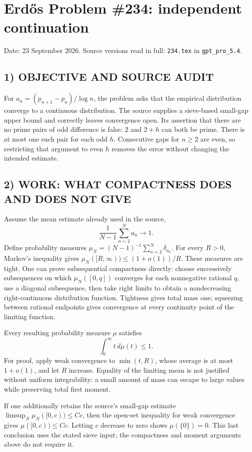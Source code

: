 \section{Erd\H{o}s Problem \#234: independent continuation}
\noindent Date: 23 September 2026. Source versions read in full: \texttt{234.tex} in \texttt{gpt\_pro\_5.4}.

\subsection*{1) OBJECTIVE AND SOURCE AUDIT}
For $a_n=(p_{n+1}-p_n)/\log n$, the problem asks that the empirical
distribution converge to a continuous distribution. The source supplies
a sieve-based small-gap upper bound and correctly leaves convergence open.
Its assertion that there are no prime pairs of odd difference is false:
$2$ and $2+h$ can both be prime. There is at most one such pair for each odd
$h$. Consecutive gaps for $n\ge2$ are even, so restricting that argument to
even $h$ removes the error without changing the intended estimate.

\subsection*{2) WORK: WHAT COMPACTNESS DOES AND DOES NOT GIVE}
Assume the mean estimate already used in the source,
\[
 \frac1{N-1}\sum_{n=2}^N a_n\longrightarrow1.
\]
Define probability measures $\mu_N=(N-1)^{-1}\sum_{n=2}^N\delta_{a_n}$.
For every $R>0$, Markov's inequality gives
$\mu_N([R,\infty))\le(1+o(1))/R$. These measures are tight.
One can prove subsequential compactness directly: choose successively
subsequences on which $\mu_N([0,q])$ converges for each nonnegative rational
$q$, use a diagonal subsequence, then take right limits to obtain a
nondecreasing right-continuous distribution function. Tightness gives
total mass one; squeezing between rational endpoints gives convergence
at every continuity point of the limiting function.

Every resulting probability measure $\mu$ satisfies
\[
 \int_0^\infty t\,d\mu(t)\le1.
\]
For proof, apply weak convergence to $\min(t,R)$, whose average is at most
$1+o(1)$, and let $R$ increase. Equality of the limiting mean is not justified
without uniform integrability: a small amount of mass can escape to large
values while preserving total first moment.

If one additionally retains the source's small-gap estimate
$\limsup_N\mu_N([0,c))\le Cc$, then the open-set inequality for weak
convergence gives $\mu([0,c))\le Cc$. Letting $c$ decrease to zero shows
$\mu(\{0\})=0$. This last conclusion uses the stated sieve input; the
compactness and moment arguments above do not require it.

